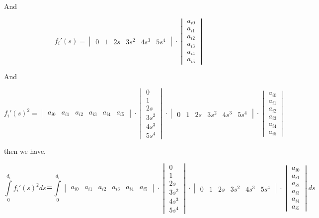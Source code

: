 \documentclass[a4paper,11pt]{article}  %
\begin{document}
And

$$
f_i'(s) =
\begin{vmatrix} 0 & 1 & 2s & 3s^2 & 4s^3 & 5s^4 \end{vmatrix}
\cdot
\begin{vmatrix} a_{i0} \\ a_{i1} \\ a_{i2} \\ a_{i3} \\ a_{i4} \\ a_{i5} \end{vmatrix}   
$$



And 

$$
f_i'(s)^2 =
\begin{vmatrix} a_{i0} & a_{i1} & a_{i2} & a_{i3} & a_{i4} & a_{i5}  \end{vmatrix} 
\cdot 
\begin{vmatrix} 0 \\ 1 \\ 2s \\ 3s^2 \\ 4s^3 \\ 5s^4 \end{vmatrix} 
\cdot 
\begin{vmatrix} 0 & 1 & 2s & 3s^2 & 4s^3 & 5s^4 \end{vmatrix} 
\cdot 
\begin{vmatrix} a_{i0} \\ a_{i1} \\ a_{i2} \\ a_{i3} \\ a_{i4} \\ a_{i5}  \end{vmatrix}
$$

then we have,

$$
\int\limits_{0}^{d_i} f_i'(s)^2 ds ＝
\int\limits_{0}^{d_i}
\begin{vmatrix} a_{i0} & a_{i1} & a_{i2} & a_{i3} & a_{i4} & a_{i5} \end{vmatrix} 
\cdot  
\begin{vmatrix} 0 \\ 1 \\ 2s \\ 3s^2 \\ 4s^3 \\ 5s^4 \end{vmatrix} 
\cdot 
\begin{vmatrix} 0 & 1 & 2s & 3s^2 & 4s^3 & 5s^4 \end{vmatrix} 
\cdot 
\begin{vmatrix} a_{i0} \\ a_{i1} \\ a_{i2} \\ a_{i3} \\ a_{i4} \\ a_{i5}  \end{vmatrix} ds
$$
\end{document}
